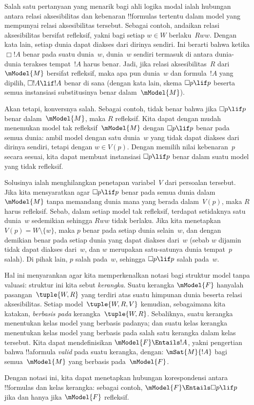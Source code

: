 \documentclass[../../../include/open-logic-section]{subfiles}
\begin{document}


Salah satu pertanyaan yang menarik bagi ahli logika modal ialah hubungan antara
relasi aksesibilitas dan kebenaran !!{formula}s tertentu dalam model yang
mempunyai relasi aksesibilitas tersebut. Sebagai contoh, andaikan relasi
aksesibilitas bersifat refleksif, yakni bagi setiap $w\in W$ berlaku~$Rww$.
Dengan kata lain, setiap dunia dapat diakses dari dirinya sendiri. Ini berarti
bahwa ketika $\Box !A$ benar pada suatu dunia~$w$, dunia~$w$ sendiri termasuk
di antara dunia-dunia terakses tempat~$!A$ harus benar. Jadi, jika relasi
aksesibilitas~$R$ dari~$\mModel{M}$ bersifat refleksif, maka apa pun dunia~$w$
dan formula~$!A$ yang dipilih, $\Box !A\lif !A$ benar di sana (dengan kata
lain, skema $\Box p\lif p$ beserta semua instansiasi substitusinya benar
dalam~$\mModel{M}$).

Akan tetapi, konversnya salah. Sebagai contoh, tidak benar bahwa jika
$\Box p\lif p$ benar dalam~$\mModel{M}$, maka $R$ refleksif. Kita dapat
dengan mudah menemukan model tak refleksif~$\mModel{M}$ dengan
$\Box p\lif p$ benar pada semua dunia: ambil model dengan satu dunia~$w$ yang
tidak dapat diakses dari dirinya sendiri, tetapi dengan $w\in V(p)$. Dengan
memilih nilai kebenaran~$p$ secara sesuai, kita dapat membuat instansiasi
$\Box p\lif p$ benar dalam suatu model yang tidak refleksif.

Solusinya ialah menghilangkan penetapan variabel~$V$ dari persoalan tersebut.
Jika kita mensyaratkan agar $\Box p\lif p$ benar pada semua dunia
dalam~$\mModel{M}$ tanpa memandang dunia mana yang berada dalam~$V(p)$, maka
$R$ harus refleksif. Sebab, dalam setiap model tak refleksif, terdapat
setidaknya satu dunia~$w$ sedemikian sehingga $Rww$ tidak berlaku. Jika kita
menetapkan $V(p)=W\setminus\{w\}$, maka $p$ benar pada setiap dunia selain~$w$,
dan dengan demikian benar pada setiap dunia yang dapat diakses dari~$w$
(sebab $w$ dijamin tidak dapat diakses dari~$w$, dan $w$ merupakan satu-satunya
dunia tempat~$p$ salah). Di pihak lain, $p$ salah pada~$w$, sehingga
$\Box p\lif p$ salah pada~$w$.

Hal ini menyarankan agar kita memperkenalkan notasi bagi struktur model tanpa
valuasi: struktur ini kita sebut \emph{kerangka}. Suatu kerangka
$\mModel{F}$ hanyalah pasangan~$\tuple{W,R}$ yang terdiri atas suatu himpunan
dunia beserta relasi aksesibilitas. Setiap model~$\tuple{W,R,V}$ kemudian,
sebagaimana kita katakan, \emph{berbasis pada} kerangka~$\tuple{W,R}$.
Sebaliknya, suatu kerangka menentukan kelas model yang berbasis padanya; dan
suatu kelas kerangka menentukan kelas model yang berbasis pada salah satu
kerangka dalam kelas tersebut. Kita dapat mendefinisikan
$\mModel{F}\Entails !A$, yakni pengertian bahwa !!a{formula} \emph{valid}
pada suatu kerangka, dengan: $\mSat{M}{!A}$ bagi semua~$\mModel{M}$ yang
berbasis pada~$\mModel{F}$.

Dengan notasi ini, kita dapat menetapkan hubungan korespondensi antara
!!{formula}s dan kelas kerangka: sebagai contoh,
$\mModel{F}\Entails\Box p\lif p$ jika dan hanya jika $\mModel{F}$ refleksif.
\end{document}
